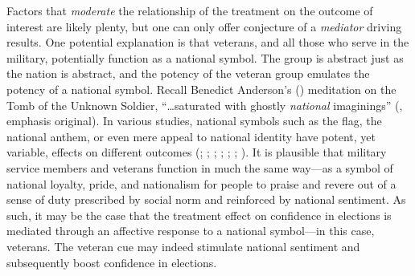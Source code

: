 \documentclass[
  12pt,
  letterpaper,
]{article}
\begin{document}
Factors that \emph{moderate} the relationship of the treatment on the
outcome of interest are likely plenty, but one can only offer conjecture
of a \emph{mediator} driving results. One potential explanation is that
veterans, and all those who serve in the military, potentially function
as a national symbol. The group is abstract just as the nation is
abstract, and the potency of the veteran group emulates the potency of a
national symbol. Recall Benedict Anderson's
() meditation on the Tomb of the
Unknown Soldier, ``\ldots saturated with ghostly \emph{national}
imaginings'' (, emphasis original).
In various studies, national symbols such as the flag, the national
anthem, or even mere appeal to national identity have potent, yet
variable, effects on different outcomes (; ;
;
;
;
;
). It is plausible that
military service members and veterans function in much the same way---as
a symbol of national loyalty, pride, and nationalism for people to
praise and revere out of a sense of duty prescribed by social norm and
reinforced by national sentiment. As such, it may be the case that the
treatment effect on confidence in elections is mediated through an
affective response to a national symbol---in this case, veterans. The
veteran cue may indeed stimulate national sentiment and subsequently
boost confidence in elections.
\end{document}
